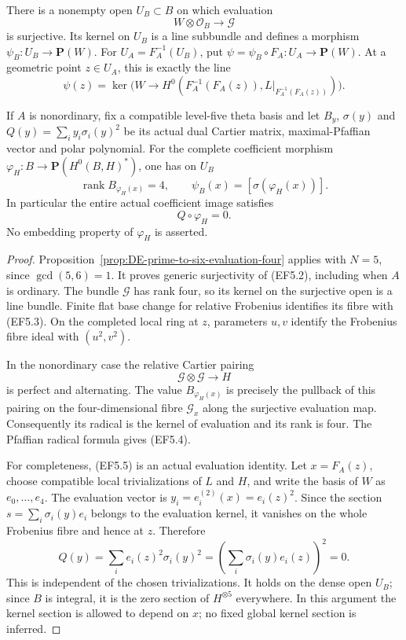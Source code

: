 \begin{lemma}
\label{lem:DE-five-evaluation-kernel}
There is a nonempty open \(U_B\subset B\) on which evaluation
\[
              W\otimes\mathcal O_B\longrightarrow\mathcal G
                                                        \tag{EF5.2}
\]
is surjective. Its kernel on \(U_B\) is a line subbundle and
defines a morphism \(\psi_B:U_B\to\mathbf P(W)\).
For \(U_A=F_A^{-1}(U_B)\), put
\(\psi=\psi_B\circ F_A:U_A\to\mathbf P(W)\).
At a geometric point \(z\in U_A\), this is exactly the line
\[
 \psi(z)=\ker\bigl(W\longrightarrow
          H^0(F_A^{-1}(F_A(z)),L|_{F_A^{-1}(F_A(z))})\bigr).
 \tag{EF5.3}
\]

If \(A\) is nonordinary, fix a compatible level-five theta
basis and let \(B_y\), \(\sigma(y)\) and
\(Q(y)=\sum_i y_i\sigma_i(y)^2\) be its actual dual Cartier
matrix, maximal-Pfaffian vector and polar polynomial. For the
complete coefficient morphism
\(\varphi_H:B\to\mathbf P(H^0(B,H)^*)\), one has on \(U_B\)
\[
 \operatorname{rank}B_{\varphi_H(x)}=4,
 \qquad \psi_B(x)=[\sigma(\varphi_H(x))].
 \tag{EF5.4}
\]
In particular the entire actual coefficient image satisfies
\[
                     Q\circ\varphi_H=0.
 \tag{EF5.5}
\]
No embedding property of \(\varphi_H\) is asserted.
\end{lemma}
\begin{proof}
Proposition~\ref{prop:DE-prime-to-six-evaluation-four} applies
with \(N=5\), since \(\gcd(5,6)=1\). It proves generic
surjectivity of (EF5.2), including when \(A\) is ordinary.
The bundle \(\mathcal G\) has rank four, so its kernel on the
surjective open is a line bundle. Finite flat base change for
relative Frobenius identifies its fibre with (EF5.3).
On the completed local ring at \(z\), parameters \(u,v\)
identify the Frobenius fibre ideal with \((u^2,v^2)\).

In the nonordinary case the relative Cartier pairing
\[
                  \mathcal G\otimes\mathcal G\longrightarrow H
 \tag{EF5.6}
\]
is perfect and alternating. The value \(B_{\varphi_H(x)}\)
is precisely the pullback of this pairing on the four-dimensional
fibre \(\mathcal G_x\) along the surjective evaluation map.
Consequently its radical is the kernel of evaluation and its
rank is four. The Pfaffian radical formula gives (EF5.4).

For completeness, (EF5.5) is an actual evaluation identity.
Let \(x=F_A(z)\), choose compatible local trivializations of
\(L\) and \(H\), and write the basis of \(W\) as
\(e_0,\ldots,e_4\). The evaluation vector is
\(y_i=e_i^{(2)}(x)=e_i(z)^2\). Since the section
\(s=\sum_i\sigma_i(y)e_i\) belongs to the evaluation kernel,
it vanishes on the whole Frobenius fibre and hence at \(z\).
Therefore
\[
 Q(y)=\sum_i e_i(z)^2\sigma_i(y)^2
       =\left(\sum_i\sigma_i(y)e_i(z)\right)^2=0.
 \tag{EF5.7}
\]
This is independent of the chosen trivializations. It holds on
the dense open \(U_B\); since \(B\) is integral, it is the
zero section of \(H^{\otimes5}\) everywhere. In this argument
the kernel section is allowed to depend on \(x\); no fixed
global kernel section is inferred.
\end{proof}

